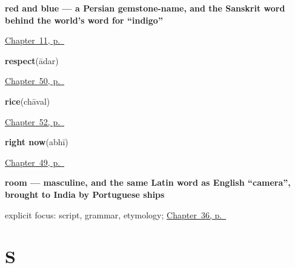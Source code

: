 \noindent\begin{minipage}[t]{\linewidth}
\raggedright
\textbf{red and blue — a Persian gemstone-name, and the Sanskrit word behind the world's word for \textquotedblleft{}indigo\textquotedblright{}}\enspace\emph{ }\par
\footnotesize \hyperref[ch:hi-core-colours]{Chapter~11, p.~\pageref*{ch:hi-core-colours}}
\end{minipage}\par\smallskip

\noindent\begin{minipage}[t]{\linewidth}
\raggedright
\textbf{respect}\enspace\emph{}\enspace(ādar)\par
\footnotesize \hyperref[ch:hi-courtesy]{Chapter~50, p.~\pageref*{ch:hi-courtesy}}
\end{minipage}\par\smallskip

\noindent\begin{minipage}[t]{\linewidth}
\raggedright
\textbf{rice}\enspace\emph{}\enspace(chāval)\par
\footnotesize \hyperref[ch:hi-in-the-kitchen]{Chapter~52, p.~\pageref*{ch:hi-in-the-kitchen}}
\end{minipage}\par\smallskip

\noindent\begin{minipage}[t]{\linewidth}
\raggedright
\textbf{right now}\enspace\emph{}\enspace(abhī)\par
\footnotesize \hyperref[ch:hi-taking-leave]{Chapter~49, p.~\pageref*{ch:hi-taking-leave}}
\end{minipage}\par\smallskip

\noindent\begin{minipage}[t]{\linewidth}
\raggedright
\textbf{room — masculine, and the same Latin word as English \textquotedblleft{}camera\textquotedblright{}, brought to India by Portuguese ships}\enspace\emph{}\par
\footnotesize explicit focus: script, grammar, etymology; \hyperref[ch:hi-one-house-four-languages]{Chapter~36, p.~\pageref*{ch:hi-one-house-four-languages}}
\end{minipage}\par\smallskip

\section*{S}


